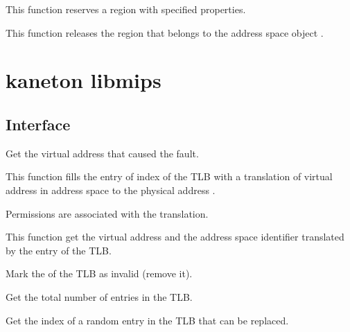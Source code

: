 	 {
	   This function reserves a region with specified properties.
	 }

	 {
	   This function releases the region  that belongs
	   to the address space object .
	 }


\newpage

\section*{kaneton libmips}

\subsection*{Interface}

{
  Get the virtual address that caused the fault.
}

{
  This function fills the entry of index  of the TLB
  with a translation of virtual address  in address
  space  to the physical address .

  Permissions  are associated with the translation.
}

{
  This function get the virtual address  and the
  address space identifier  translated by the entry
   of the TLB.
}

{
  Mark the  of the TLB as invalid (remove it).
}

{
  Get the total number of entries in the TLB.
}

{
  Get the index of a random entry in the TLB that can be replaced.
}



